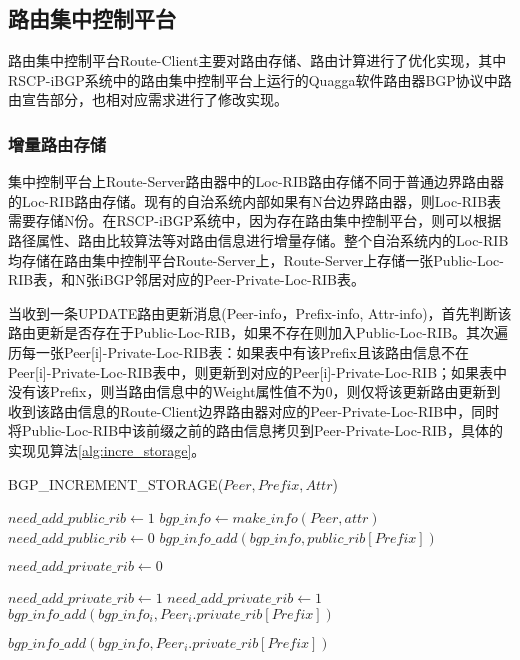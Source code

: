 \subsection{路由集中控制平台}

路由集中控制平台Route-Client主要对路由存储、路由计算进行了优化实现，其中RSCP-iBGP系统中的路由集中控制平台上运行的Quagga软件路由器BGP协议中路由宣告部分，也相对应需求进行了修改实现。

\subsubsection{增量路由存储}

集中控制平台上Route-Server路由器中的Loc-RIB路由存储不同于普通边界路由器的Loc-RIB路由存储。现有的自治系统内部如果有N台边界路由器，则Loc-RIB表需要存储N份。在RSCP-iBGP系统中，因为存在路由集中控制平台，则可以根据路径属性、路由比较算法等对路由信息进行增量存储。整个自治系统内的Loc-RIB均存储在路由集中控制平台Route-Server上，Route-Server上存储一张Public-Loc-RIB表，和N张iBGP邻居对应的Peer-Private-Loc-RIB表。

当收到一条UPDATE路由更新消息(Peer-info，Prefix-info, Attr-info)，首先判断该路由更新是否存在于Public-Loc-RIB，如果不存在则加入Public-Loc-RIB。其次遍历每一张Peer[i]-Private-Loc-RIB表：如果表中有该Prefix且该路由信息不在Peer[i]-Private-Loc-RIB表中，则更新到对应的Peer[i]-Private-Loc-RIB；如果表中没有该Prefix，则当路由信息中的Weight属性值不为0，则仅将该更新路由更新到收到该路由信息的Route-Client边界路由器对应的Peer-Private-Loc-RIB中，同时将Public-Loc-RIB中该前缀之前的路由信息拷贝到Peer-Private-Loc-RIB，具体的实现见算法\ref{alg:incre_storage}。

\begin{algorithm}[!h]
    \caption{BGP\_INCREMENT\_STORAGE($Peer, Prefix, Attr$)}%
    \label{alg:incre_storage}
    \begin{algorithmic}[1]%
        \STATE $need\_add\_public\_rib \gets 1$
        \STATE $bgp\_info \gets make\_info(Peer, attr)$
        \STATE $need\_add\_public\_rib \gets 0$
        \ENDIF
        \STATE $bgp\_info\_add(bgp\_info, public\_rib[Prefix])$
        \ENDIF

        \STATE $need\_add\_private\_rib \gets 0$

        \STATE $need\_add\_private\_rib \gets 1$
        \ENDIF
        \STATE $need\_add\_private\_rib \gets 1$
        \STATE $bgp\_info\_add(bgp\_info_i, Peer_i.private\_rib[Prefix])$
        \ENDFOR
        \ENDIF

        \STATE $bgp\_info\_add(bgp\_info, Peer_i.private\_rib[Prefix])$
        \ENDIF

        \ENDFOR
    \end{algorithmic}
\end{algorithm}


